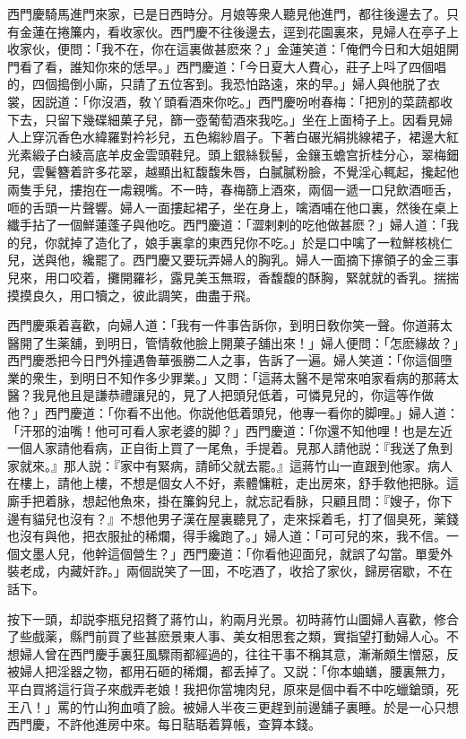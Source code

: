 西門慶騎馬進門來家，已是日西時分。月娘等衆人聽見他進門，都往後邊去了。只有金蓮在捲簾内，看收家伙。西門慶不往後邊去，逕到花園裏來，見婦人在亭子上收家伙，便問：「我不在，你在這裏做甚麽來？」金蓮笑道：「俺們今日和大姐姐開門看了看，誰知你來的恁早。」西門慶道：「今日夏大人費心，莊子上呌了四個唱的，四個搗倒小廝，只請了五位客到。我恐怕路遠，來的早。」婦人與他脱了衣裳，因説道：「你沒酒，敎丫頭看酒來你吃。」西門慶吩咐春梅：「把別的菜蔬都收下去，只留下幾碟細菓子兒，篩一壺葡萄酒來我吃。」坐在上面椅子上。因看見婦人上穿沉香色水緯羅對衿衫兒，五色縐紗眉子。下著白碾光絹挑線裙子，裙邊大紅光素緞子白綾高底羊皮金雲頭鞋兒。頭上銀絲䯼髻，金鑲玉蟾宫折桂分心，翠梅鈿兒，雲鬢簪着許多花翠，越顯出紅馥馥朱唇，白膩膩粉臉，不覺淫心輒起，攙起他兩隻手兒，摟抱在一䖏親嘴。不一時，春梅篩上酒來，兩個一遞一口兒飲酒咂舌，咂的舌頭一片聲響。婦人一面摟起裙子，坐在身上，噙酒哺在他口裏，然後在桌上纖手拈了一個鮮蓮蓬子與他吃。西門慶道：「澀剌剌的吃他做甚麽？」婦人道：「我的兒，你就掉了造化了，娘手裏拿的東西兒你不吃。」於是口中噙了一粒鮮核桃仁兒，送與他，纔罷了。西門慶又要玩弄婦人的胸乳。婦人一面摘下㩟領子的金三事兒來，用口咬着，攤開羅衫，露見美玉無瑕，香馥馥的酥胸，緊就就的香乳。揣揣摸摸良久，用口犢之，彼此調笑，曲盡于飛。

西門慶乘着喜歡，向婦人道：「我有一件事告訴你，到明日敎你笑一聲。你道蔣太醫開了生薬舖，到明日，管情敎他臉上開菓子舖出來！」婦人便問：「怎麽緣故？」西門慶悉把今日門外撞遇魯華張勝二人之事，告訴了一遍。婦人笑道：「你這個墮業的衆生，到明日不知作多少罪業。」又問：「這蔣太醫不是常來咱家看病的那蔣太醫？我見他且是謙恭禮讓兒的，見了人把頭兒低着，可憐見兒的，你這等作做他？」西門慶道：「你看不出他。你説他低着頭兒，他專一看你的脚哩。」婦人道：「汗邪的油嘴！他可可看人家老婆的脚？」西門慶道：「你還不知他哩！也是左近一個人家請他看病，正自街上買了一尾魚，手提着。見那人請他説：『我送了魚到家就來。』那人説：『家中有緊病，請師父就去罷。』這蔣竹山一直跟到他家。病人在樓上，請他上樓，不想是個女人不好，素體慵粧，走出房來，舒手敎他把脉。這廝手把着脉，想起他魚來，掛在簾鈎兒上，就忘記看脉，只顧且問：『嫂子，你下邊有貓兒也沒有？』不想他男子漢在屋裏聽見了，走來採着毛，打了個臭死，薬錢也沒有與他，把衣服扯的稀爛，得手纔跑了。」婦人道：「可可兒的來，我不信。一個文墨人兒，他幹這個營生？」西門慶道：「你看他迎面兒，就誤了勾當。單愛外裝老成，内藏奸詐。」兩個説笑了一囬，不吃酒了，收拾了家伙，歸房宿歇，不在話下。

按下一頭，却説李瓶兒招贅了蔣竹山，約兩月光景。初時蔣竹山圖婦人喜歡，修合了些戲薬，縣門前買了些甚麽景東人事、美女相思套之類，實指望打動婦人心。不想婦人曾在西門慶手裏狂風驟雨都經過的，往往干事不稱其意，漸漸頗生憎惡，反被婦人把淫器之物，都用石砸的稀爛，都丢掉了。又説：「你本蛐蟮，腰裏無力，平白買將這行貨子來戲弄老娘！我把你當塊肉兒，原來是個中看不中吃蠟鎗頭，死王八！」罵的竹山狗血噴了臉。被婦人半夜三更趕到前邊舖子裏睡。於是一心只想西門慶，不許他進房中來。每日聐聒着算帳，查算本錢。

